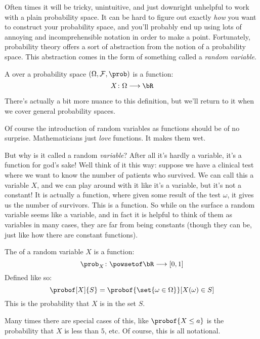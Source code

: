 Often times it will be tricky, unintuitive, and just downright unhelpful to work with a plain probability space.
It can be hard to figure out exactly {\sl how} you want to construct your probability space, and you'll probably end up
using lots of annoying and incomprehensible notation in order to make a point.
Fortunately, probability theory offers a sort of abstraction from the notion of a probability space.
This abstraction comes in the form of something called a {\sl random variable}.

\begin{defn*}

	A  over a probability space $(\Omega, \cF, \prob)$ is a function:
	\[ X\colon\Omega\longrightarrow\bR \]

\end{defn*}

\begin{note}

	There's actually a bit more nuance to this definition, but we'll return to it when we cover general probability spaces.

\end{note}

Of course the introduction of random variables as functions should be of no surprise.
Mathematicians just {\sl love} functions.
It makes them wet.

But why is it called a random {\sl variable}?
After all it's hardly a variable, it's a function for god's sake!
Well think of it this way: suppose we have a clinical test where we want to know the number of patients who survived.
We can call this a variable $X$, and we can play around with it like it's a variable, but it's not a constant!
It is actually a function, where given some result of the test $\omega$, it gives us the number of survivors.
This is a function.
So while on the surface a random variable seems like a variable, and in fact it is helpful to think of them as variables in
many cases, they are far from being constants (though they can be, just like how there are constant functions).

\begin{defn*}

	The  of a random variable $X$ is a function:
	\[ \prob_X\colon\powsetof\bR\longrightarrow[0,1] \]
	Defined like so:
	\[ \probof[X]{S} = \probof{\set{\omega\in\Omega}}[X(\omega)\in S] \]
	This is the probability that $X$ is in the set $S$.

	Many times there are special cases of this, like $\probof{X\leq a}$ is the probability that $X$ is less than $5$, etc.
	Of course, this is all notational.

\end{defn*}

